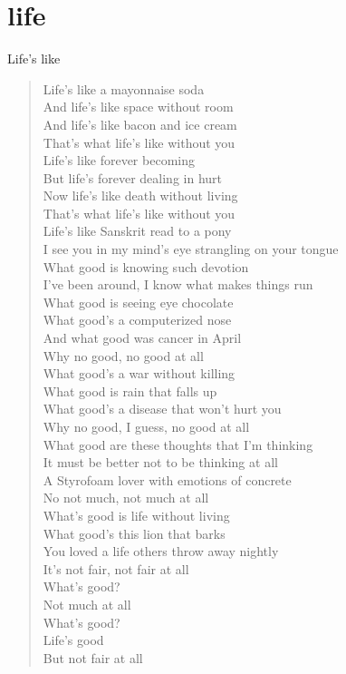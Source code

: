 \section{life}
Life's like
\begin{verse}
Life's like a mayonnaise soda\\
And life's like space without room\\ 
And life's like bacon and ice cream\\ 
That's what life's like without you\\
Life's like forever becoming \\
But life's forever dealing in hurt\\ 
Now life's like death without living\\ 
That's what life's like without you\\
Life's like Sanskrit read to a pony \\
I see you in my mind's eye strangling on your tongue \\
What good is knowing such devotion \\
I've been around, I know what makes things run \\
What good is seeing eye chocolate \\
What good's a computerized nose \\
And what good was cancer in April\\
Why no good, no good at all\\
What good's a war without killing\\ 
What good is rain that falls up \\
What good's a disease that won't hurt you \\
Why no good, I guess, no good at all\\
What good are these thoughts that I'm thinking \\
It must be better not to be thinking at all \\
A Styrofoam lover with emotions of concrete \\
No not much, not much at all\\
What's good is life without living \\
What good's this lion that barks \\
You loved a life others throw away nightly \\
It's not fair, not fair at all\\
What's good? \\
Not much at all\\
What's good? \\
Life's good \\
But not fair at all\\
\end{verse}

